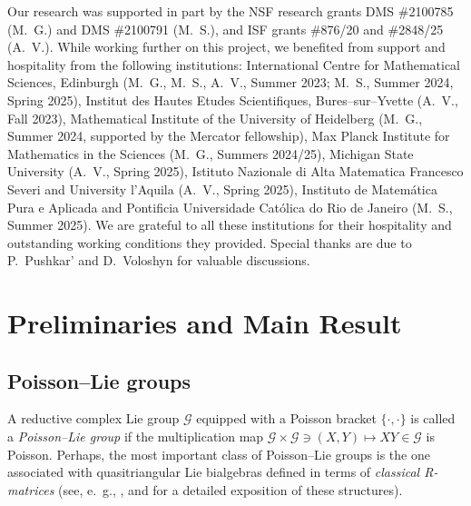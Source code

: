 \documentclass{amsart}
\theoremstyle{definition}
\theoremstyle{remark}
\numberwithin{equation}{section}
\numberwithin{theorem}{section}
\def\G{{\mathcal G}}
\def\Poi{{\{{\cdot},{\cdot}\}}}
\begin{document}
 
Our research was supported in part by the NSF research grants DMS \#2100785 (M.~G.) and  DMS \#2100791 (M.~S.), and ISF grants \#876/20 and \#2848/25 (A.~V.).  
 While working further on this project, we benefited from support and hospitality from the following institutions: International Centre for Mathematical Sciences, Edinburgh (M.~G., M.~S., A.~V., Summer 2023; M.~S., Summer 2024, Spring 2025), Institut des Hautes Etudes Scientifiques,
Bures–sur–Yvette (A.~V., Fall 2023),
Mathematical Institute of the University of Heidelberg (M.~G., Summer 2024, supported by the Mercator fellowship), Max Planck Institute for Mathematics in the Sciences (M.~G., Summers 2024/25), Michigan State University (A.~V., Spring 2025),
Istituto Nazionale di Alta Matematica Francesco Severi and University l'Aquila (A.~V., Spring 2025), Instituto de 
Matem\'atica Pura e Aplicada and Pontificia Universidade Cat\'olica do Rio de Janeiro (M.~S., Summer 2025).
 We are grateful to all these institutions for their hospitality and outstanding working conditions they provided. 
 Special thanks are due to P.~Pushkar' and D.~Voloshyn for valuable discussions.









  



\section{Preliminaries and Main Result}\label{sec:prelim}
\subsection{Poisson--Lie groups} 
A reductive complex Lie group $\G$ equipped with a Poisson bracket $\Poi$ is called a {\em Poisson--Lie group\/}
if the multiplication map $\G\times \G \ni (X,Y) \mapsto XY \in \G$
is Poisson. Perhaps, the most important class of Poisson--Lie groups
is the one associated with quasitriangular Lie bialgebras defined in terms of  {\em classical R-matrices\/} 
(see, e.~g., \cite[Ch.~1]{CP}, \cite{r-sts} and \cite{Ya} for a detailed exposition of these structures).
\end{document}
